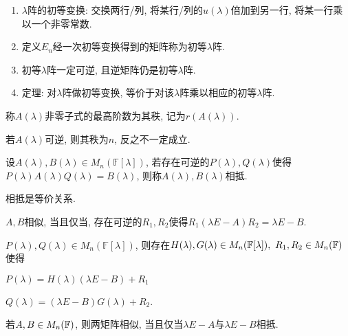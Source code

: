 \begin{example}
    \par
    \begin{enumerate}[itemindent=1em]
        \item $\lambda$阵的初等变换: 交换两行/列, 将某行/列的$u(\lambda)$倍加到另一行, 将某一行乘以一个非零常数.
        \item 定义$E_n$经一次初等变换得到的矩阵称为初等$\lambda$阵.
        \item 初等$\lambda$阵一定可逆, 且逆矩阵仍是初等$\lambda$阵.
        \item 定理: 对$\lambda$阵做初等变换, 等价于对该$\lambda$阵乘以相应的初等$\lambda$阵.
    \end{enumerate}
\end{example}

\begin{definition}
    称$A(\lambda)$非零子式的最高阶数为其秩, 记为$r(A(\lambda))$.
\end{definition}

\begin{statement}
    若$A(\lambda)$可逆, 则其秩为$n$, 反之不一定成立.
\end{statement}

\begin{definition}
    设$A(\lambda),B(\lambda)\in M_n(\mathbb{F}[\lambda])$, 若存在可逆的$P(\lambda),Q(\lambda)$使得
    $P(\lambda)A(\lambda)Q(\lambda)=B(\lambda)$, 则称$A(\lambda),B(\lambda)$相抵.\par
    相抵是等价关系.
\end{definition}

\begin{lemma}
    $A,B$相似, 当且仅当, 存在可逆的$R_1, R_2$使得$R_1(\lambda E-A)R_2=\lambda E - B$.
\end{lemma}

\begin{lemma}
    $P(\lambda),Q(\lambda)\in M_n(\mathbb{F}[\lambda])$, 
    则存在$H(\lambda),G(\lambda)\in M_n(\mathbb{F}[\lambda]),\ R_1, R_2\in M_{n}(\mathbb{F})$使得\par
    $P(\lambda)=H(\lambda)(\lambda E-B)+R_1$\par
    $Q(\lambda)=(\lambda E-B)G(\lambda)+R_2$.
\end{lemma}

\begin{theorem}[矩阵相似的充要条件]
    若$A,B\in M_{n}(\mathbb{F})$, 则两矩阵相似, 当且仅当$\lambda E-A$与$\lambda E-B$相抵.
\end{theorem}

